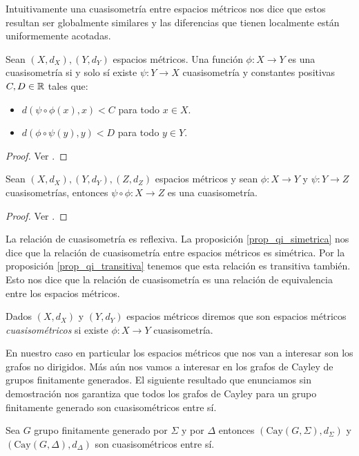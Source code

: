 \documentclass[tesis.tex]{subfiles}
\begin{document}
Intuitivamente una cuasisometría entre espacios métricos nos dice que estos resultan ser globalmente similares y las diferencias que tienen localmente están uniformemente acotadas. 

\medskip
\begin{prop}\label{prop_qi_simetrica}
	Sean $(X,d_X),(Y,d_Y)$ espacios métricos. 
	Una función $\phi:X \to Y$ es una cuasisometría si y solo sí existe 
	$\psi:Y \to X$ cuasisometría y constantes positivas $C,D \in \mathbb{R}$ tales que:
	\begin{itemize}
		\item $d(\psi \circ \phi (x), x) < C$ para todo $x \in X$.
		\item $d(\phi \circ \psi (y), y) < D$ para todo $y \in Y$. 
	\end{itemize}
\end{prop}
\begin{proof}
	Ver \cite[pp.84-85]{loh2017geometric}.
\end{proof}

\begin{prop}\label{prop_qi_transitiva}
	Sean $(X,d_X),(Y,d_Y), (Z, d_{Z})$ espacios métricos y sean $\phi:X \to Y$ y $\psi:Y \to Z$ cuasisometrías,
	 entonces $\psi \circ \phi: X \to Z$ es una cuasisometría.
\end{prop}
\begin{proof}
	Ver \cite[p.86]{loh2017geometric}.
\end{proof}




La relación de cuasisometría es reflexiva.
La proposición \ref{prop_qi_simetrica} nos dice que la relación de cuasisometría entre espacios métricos es simétrica.
Por la proposición \ref{prop_qi_transitiva} tenemos que esta relación es transitiva también. 
Esto nos dice que la relación de cuasisometría es una relación de equivalencia entre los espacios métricos.
\begin{deff}
	Dados $(X,d_{X})$ y $(Y,d_{Y})$ espacios métricos diremos que son espacios métricos \emph{cuasisométricos} si existe $\phi:X \to Y$ cuasisometría. 
\end{deff}



En nuestro caso en particular los espacios métricos que nos van a interesar son los grafos no dirigidos.
Más aún nos vamos a interesar en los grafos de Cayley de grupos finitamente generados.
El siguiente resultado que enunciamos sin demostración nos garantiza que todos los grafos de Cayley para un grupo finitamente generado son cuasisométricos entre sí.
\begin{prop}
	Sea $G$ grupo finitamente generado por $\Sigma$ y por $\Delta$ entonces $(\text{Cay}(G,\Sigma), d_{\Sigma})$ y $(\text{Cay}(G, \Delta), d_{\Delta})$ son cuasisométricos entre sí.
\end{prop}
\end{document}
